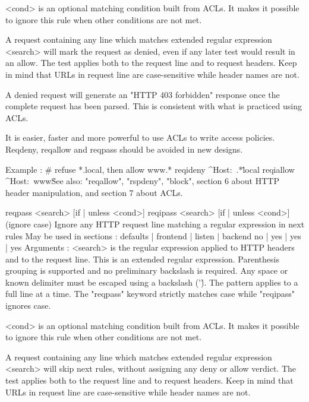     <cond>    is an optional matching condition built from ACLs. It makes it
              possible to ignore this rule when other conditions are not met.

  A request containing any line which matches extended regular expression
  <search> will mark the request as denied, even if any later test would
  result in an allow. The test applies both to the request line and to request
  headers. Keep in mind that URLs in request line are case-sensitive while
  header names are not.

  A denied request will generate an "HTTP 403 forbidden" response once the
  complete request has been parsed. This is consistent with what is practiced
  using ACLs.

  It is easier, faster and more powerful to use ACLs to write access policies.
  Reqdeny, reqallow and reqpass should be avoided in new designs.

  Example :
     # refuse *.local, then allow www.*
     reqideny  ^Host:\ .*\.local
     reqiallow ^Host:\ www\.

  See also: "reqallow", "rspdeny", "block", section 6 about HTTP header
            manipulation, and section 7 about ACLs.


reqpass  <search> [{if | unless} <cond>]
reqipass <search> [{if | unless} <cond>]  (ignore case)
  Ignore any HTTP request line matching a regular expression in next rules
  May be used in sections :   defaults | frontend | listen | backend
                                 no    |    yes   |   yes  |   yes
  Arguments :
    <search>  is the regular expression applied to HTTP headers and to the
              request line. This is an extended regular expression. Parenthesis
              grouping is supported and no preliminary backslash is required.
              Any space or known delimiter must be escaped using a backslash
              ('\'). The pattern applies to a full line at a time. The
              "reqpass" keyword strictly matches case while "reqipass" ignores
              case.

    <cond>    is an optional matching condition built from ACLs. It makes it
              possible to ignore this rule when other conditions are not met.

  A request containing any line which matches extended regular expression
  <search> will skip next rules, without assigning any deny or allow verdict.
  The test applies both to the request line and to request headers. Keep in
  mind that URLs in request line are case-sensitive while header names are not.

